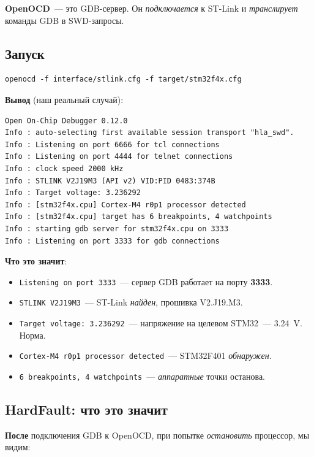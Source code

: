 \textbf{OpenOCD}~--- это GDB-сервер. Он \emph{подключается}
к ST-Link и \emph{транслирует} команды GDB в SWD-запросы.

\subsection{Запуск}

\begin{verbatim}
openocd -f interface/stlink.cfg -f target/stm32f4x.cfg
\end{verbatim}

\textbf{Вывод} (наш реальный случай):

\begin{verbatim}
Open On-Chip Debugger 0.12.0
Info : auto-selecting first available session transport "hla_swd".
Info : Listening on port 6666 for tcl connections
Info : Listening on port 4444 for telnet connections
Info : clock speed 2000 kHz
Info : STLINK V2J19M3 (API v2) VID:PID 0483:374B
Info : Target voltage: 3.236292
Info : [stm32f4x.cpu] Cortex-M4 r0p1 processor detected
Info : [stm32f4x.cpu] target has 6 breakpoints, 4 watchpoints
Info : starting gdb server for stm32f4x.cpu on 3333
Info : Listening on port 3333 for gdb connections
\end{verbatim}

\textbf{Что это значит}:

\begin{itemize}
    \item \texttt{Listening on port 3333}~--- сервер
          GDB работает на порту \textbf{3333}.
    \item \texttt{STLINK V2J19M3}~--- ST-Link \emph{найден},
          прошивка V2.J19.M3.
    \item \texttt{Target voltage: 3.236292}~--- напряжение
          на целевом STM32~--- \SI{3.24}{\volt}. Норма.
    \item \texttt{Cortex-M4 r0p1 processor detected}~---
          STM32F401 \emph{обнаружен}.
    \item \texttt{6 breakpoints, 4 watchpoints}~---
          \emph{аппаратные} точки останова.
\end{itemize}

\subsection{HardFault: что это значит}

\textbf{После} подключения GDB к OpenOCD, при попытке
\emph{остановить} процессор, мы видим:

